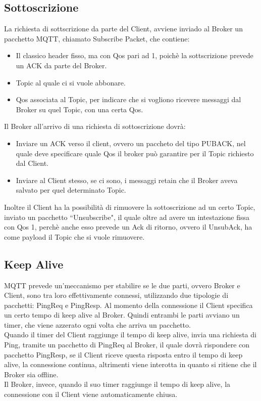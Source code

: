 \documentclass{article}
\begin{document}
\subsection{Sottoscrizione}
La richiesta di sottscrizione da parte del Client, avviene inviado al Broker un pacchetto MQTT, chiamato Subscribe Packet, che contiene:
\begin{itemize}
	\item Il classico header fisso, ma con Qos pari ad 1, poichè la sottscrizione prevede un ACK da parte del Broker.
	\item Topic al quale ci si vuole abbonare.
	\item Qos associata al Topic, per indicare che si vogliono ricevere messaggi dal Broker su quel Topic, con una certa Qos.
\end{itemize}
Il Broker all'arrivo di una richiesta di sottoscrizione dovrà:
\begin{itemize}
	\item Inviare un ACK verso il client, ovvero un paccheto del tipo PUBACK, nel quale deve specificare quale Qos il broker può garantire per il Topic richiesto dal Client.
	\item Inviare al Client stesso, se ci sono, i messaggi retain che il Broker aveva salvato per quel determinato Topic.
\end{itemize}
Inoltre il Client ha la possibilità di rimuovere la sottoscrizione ad un certo Topic, inviato un pacchetto ``Unsubscribe", il quale oltre ad avere un intestazione fissa con Qos 1, perchè anche esso prevede un Ack di ritorno, ovvero il UnsubAck, ha come payload il Topic che si vuole rimuovere.

\subsection{Keep Alive}
MQTT prevede un'meccanismo per stabilire se le due parti, ovvero Broker e Client, sono tra loro effettivamente connessi, utilizzando due tipologie di pacchetti: PingReq e PingResp. Al momento della connessione il Client specifica un certo tempo di keep alive al Broker. Quindi entrambi le parti avviano un timer, che viene azzerato ogni volta che arriva un pacchetto.\\
Quando il timer del Client raggiunge il tempo di keep alive, invia una richiesta di Ping, tramite un pacchetto di PingReq al Broker, il quale dovrà rispondere con pacchetto PingResp, se il Client riceve questa risposta entro il tempo di keep alive, la connessione continua, altrimenti viene interotta in quanto si ritiene che il Broker sia offline.\\
Il Broker, invece, quando il suo timer raggiunge il tempo di keep alive, la connessione con il Client viene automaticamente chiusa.\\
\end{document}
